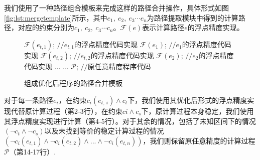 我们使用了一种路径组合模板来完成这样的路径合并操作，具体形式如图\ref{fig:lst:mergetemplate}所示，其中$e_1,\ e_2,\ e_3 \cdots e_n$为路径提取模块中得到的计算路径，对应的约束分别为$c_1,\ c_2,\ c_3 \cdots c_n$。$\mathcal{F}(e)$表示计算路径$e$的浮点精度实现。

\begin{figure}[thbp]
  \begin{algorithmic}[1]
      \STATE$\mathcal{F}(e_{t,1})$;  \hfill {{\footnotesize$//$}\small $e_{t,1}$的浮点精度代码实现}
      \STATE$\mathcal{F}(e_1)$;      \hfill {{\footnotesize$//$}\small $e_{1}$的浮点精度代码实现}
    \ENDIF
      \STATE$\mathcal{F}(e_{t,2})$;  \hfill {{\footnotesize$//$}\small $e_{t,2}$的浮点精度代码实现}
      \STATE$\mathcal{F}(e_2)$;      \hfill {{\footnotesize$//$}\small $e_{2}$的浮点精度代码实现}
    \ENDIF
    \STATE... ...
      \STATE$\mathcal{P}$; \hfill {{\footnotesize$//$}\small 原任意精度程序代码}
    \ENDIF
  \end{algorithmic}
  \caption{组成优化后程序的路径合并模板} %
  \label{lst:mergetemplate}
\end{figure}

 对于每一条路径$e_i$，在约束$c_i(e_{t,\ i})\wedge c_t$下，我们使用其优化后形式的浮点精度实现代替原计算过程（第2-3行），在约束$ci \wedge c_s$下，原计算过程本身稳定，我们使用其浮点精度实现进行计算（第4-5行）。对于其余的情况，包括了未知区间下的情况$(\neg c_t \wedge \neg c_s)$以及未找到等价的稳定计算过程的情况$(\neg c_i(e_{t,1}) \wedge \neg c_i(e_{t,2}) \wedge ... \wedge \neg c_i(e_{t,n}))$，我们则保留原任意精度的计算过程$\mathcal{P}$（第14-17行）.

